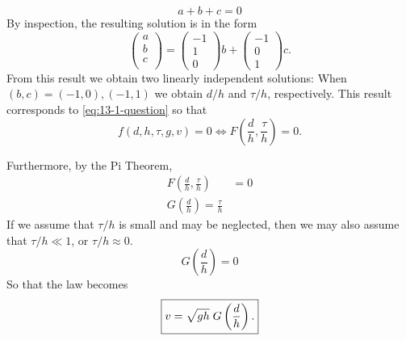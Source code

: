 \documentclass[12pt]{article}
\begin{document}
\begin{enumerate}
    \begin{equation*}
      a + b + c = 0
    \end{equation*}
    By inspection, the resulting solution is in the form
    \begin{equation*}
      \begin{pmatrix}
        a \\ b \\ c \\
      \end{pmatrix} =
      \begin{pmatrix}
        -1 \\ 1 \\ 0
      \end{pmatrix}b +
      \begin{pmatrix}
        -1 \\ 0 \\ 1
      \end{pmatrix}c.
    \end{equation*}
    From this result we obtain two linearly independent solutions: When
    $(b,c)=(-1,0),(-1,1)$ we obtain $d/h$ and $\tau/h$, respectively. This result
    corresponds to \cref{eq:13-1-question} so that
    \begin{equation*}
      f(d,h,\tau,g,v) = 0 \Longleftrightarrow F\left(\frac{d}{h},\frac{\tau}{h}\right) = 0.
    \end{equation*}

    Furthermore, by the Pi Theorem,
    \begin{equation*}
      \begin{aligned}
        F\left(\frac{d}{h},\frac{\tau}{h}\right) &= 0 \\
        G\left(\frac{d}{h}\right) = \frac{\tau}{h}
      \end{aligned}
    \end{equation*}
    If we assume that $\tau/h$ is small and may be neglected, then we may also
    assume that $\tau/h \ll 1$, or $\tau/h \approx 0$.
    \begin{equation*}
      G\left(\frac{d}{h}\right) = 0
    \end{equation*}
    So that the law becomes
    \begin{equation} \boxed{
        \label{eq:13-1-new-law}
        v=\sqrt{gh}\; G\left(\frac{d}{h}\right).
      }
    \end{equation}


\end{enumerate}
\end{document}
